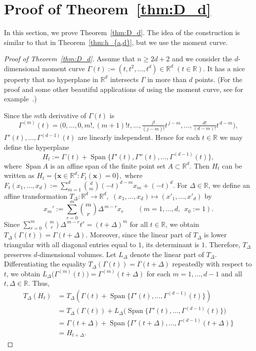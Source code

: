 \documentclass[a4paper,oneside,10pt]{amsart}
\DeclareMathOperator{\Span}{Span}
\begin{document}
\section{Proof of Theorem~\ref{thm:D_d}}
In this section, we prove Theorem~\ref{thm:D_d}. 
The idea of the construction is similar to that in Theorem~\ref{thm:h_{a,d}}, but we use the moment curve.
\begin{proof}[Proof of Theorem~\ref{thm:D_d}]
Assume that $n \geq 2d+2$ and we consider the $d$-dimensional moment curve
$
\Gamma(t):=(t,t^2,\dots,t^d)\in\mathbb R^d
\,\, (t\in\mathbb R).
$
It has a nice property that no hyperplane in \(\mathbb R^d\) intersects $\Gamma$ in more than \(d\) points. (For the proof and some other beautiful applications of using the moment curve, see for example~\cite{matouvsek2003using,ziegler2012lectures}.)

Since the $m$th derivative of $\Gamma (t)$ is
\[
\Gamma^{(m)}(t)
=
\bigl(0,\dots,0,m!, (m+1)!t,\dots,\tfrac{j!}{(j-m)!}t^{\,j-m},\dots,\tfrac{d!}{(d-m)!}t^{\,d-m}\bigr),
\]
 $\Gamma'(t),\dots,\Gamma^{(d-1)}(t)$ are linearly independent. Hence for each $t\in\mathbb R$ we may define the hyperplane
$$
H_t:=\Gamma(t)+\Span\{\Gamma'(t),\Gamma''(t),\dots,\Gamma^{(d-1)}(t)\},
$$
where $\Span A$ is an affine span of the finite point set $A \subset \mathbb{R}^d$.
Then $H_t$ can be written as
$
H_t=\{\bm{x}\in\mathbb R^d:F_t(\bm{x})=0\},
$
where
$
F_t(x_1,\dots,x_d):=
\sum_{m=1}^d \binom{d}{m}(-t)^{d-m}x_m+(-t)^d.
$
For $\Delta\in\mathbb R$, we define an affine transformation $T_\Delta:\mathbb R^d\to\mathbb R^d, \,\, (x_1, \ldots, x_d) \mapsto (x'_1, \ldots, x'_d)$ by
$$
x_m':=\sum_{r=0}^{m}\binom{m}{r}\Delta^{\,m-r}x_r
\qquad
(m=1,\dots,d,\ \ x_0:=1).
$$
Since
$
\sum_{r=0}^{m}\binom{m}{r}\Delta^{\,m-r}t^r = (t+\Delta)^m
$
for all $t \in \mathbb{R}$, 
we obtain
$
T_\Delta(\Gamma(t))=\Gamma(t+\Delta).
$
Moreover, since the linear part of $T_\Delta$ is lower triangular with all diagonal entries equal to $1$, its determinant is $1$. Therefore, $T_\Delta$ preserves $d$-dimensional volumes.
Let $L_\Delta$ denote the linear part of $T_\Delta$. Differentiating the equality
$
T_\Delta(\Gamma(t))=\Gamma(t+\Delta)
$
repeatedly with respect to $t$, we obtain
$
L_\Delta\bigl(\Gamma^{(m)}(t)\bigr)=\Gamma^{(m)}(t+\Delta)
$
 for each $m=1,\dots,d-1$ and all $t,\Delta\in\mathbb R$.
Thus,
\[
\begin{aligned}
T_\Delta(H_t)
&=
T_\Delta(\Gamma(t)+\Span\{\Gamma'(t),\dots,\Gamma^{(d-1)}(t)\}) \\
&=
T_\Delta(\Gamma(t))
+
L_\Delta\bigl(\Span\{\Gamma'(t),\dots,\Gamma^{(d-1)}(t)\}\bigr) \\
&= \Gamma(t+\Delta) + \Span\{\Gamma'(t+\Delta),\dots,\Gamma^{(d-1)}(t+\Delta)\} \\
&= H_{t+\Delta}.
\end{aligned}
\]




\end{proof}
\end{document}

